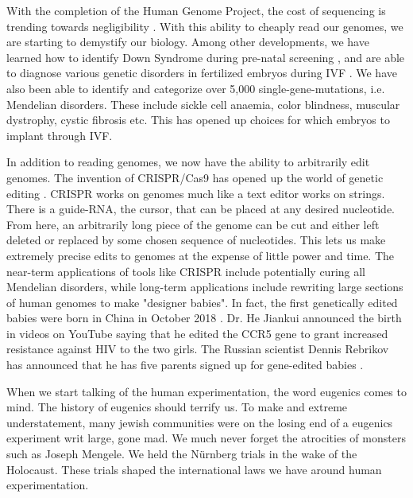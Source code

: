 With the completion of the Human Genome Project, the cost of sequencing is trending towards negligibility \cite{Wetterstrand2019}.
With this ability to cheaply read our genomes, we are starting to demystify our biology.
Among other developments, we have learned how to identify Down Syndrome during pre-natal screening \cite{Natoli2012}, and are able to diagnose various genetic disorders in fertilized embryos during IVF \cite{Rycke2017}.
We have also been able to identify and categorize over 5,000 single-gene-mutations, i.e. Mendelian disorders.
These include sickle cell anaemia, color blindness, muscular dystrophy, cystic fibrosis etc.
This has opened up choices for which embryos to implant through IVF.

In addition to reading genomes, we now have the ability to arbitrarily edit genomes.
The invention of CRISPR/Cas9 has opened up the world of genetic editing \cite{Zhang2014}.
CRISPR works on genomes much like a text editor works on strings.
There is a guide-RNA, the cursor, that can be placed at any desired nucleotide.
From here, an arbitrarily long piece of the genome can be cut and either left deleted or replaced by some chosen sequence of nucleotides.
This lets us make extremely precise edits to genomes at the expense of little power and time.
The near-term applications of tools like CRISPR include potentially curing all Mendelian disorders, while long-term applications include rewriting large sections of human genomes to make "designer babies".
In fact, the first genetically edited babies were born in China in October 2018 \cite{crisprbabies2018}.
Dr. He Jiankui announced the birth in videos on YouTube saying that he edited the CCR5 gene to grant increased resistance against HIV to the two girls.
The Russian scientist Dennis Rebrikov has announced that he has five parents signed up for gene-edited babies \cite{Cohen2019}.

When we start talking of the human experimentation, the word eugenics comes to mind.
The history of eugenics should terrify us.
To make and extreme understatement, many jewish communities were on the losing end of a eugenics experiment writ large, gone mad.
We much never forget the atrocities of monsters such as Joseph Mengele.
We held the N\"urnberg trials in the wake of the Holocaust.
These trials shaped the international laws we have around human experimentation.
